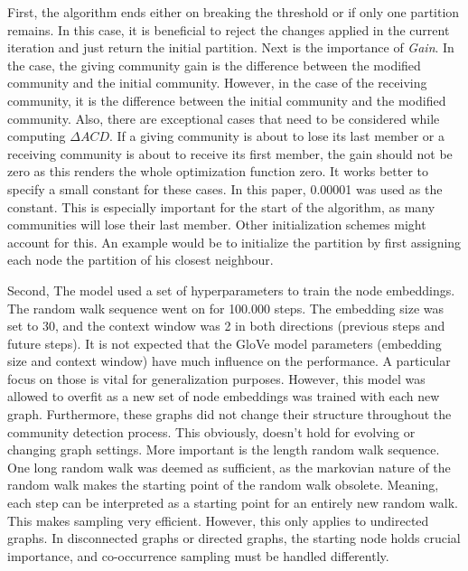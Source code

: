 \documentclass[11pt, twocolumn]{article}
\begin{document}
First, the algorithm ends either on breaking the threshold or if only one partition remains. In this case, it is beneficial to reject the changes applied in the current iteration and just return the initial partition. Next is the importance of \emph{Gain}. In the case, the giving community gain is the difference between the modified community and the initial community. However, in the case of the receiving community, it is the difference between the initial community and the modified community. Also, there are exceptional cases that need to be considered while computing $\Delta ACD$. If a giving community is about to lose its last member or a receiving community is about to receive its first member, the gain should not be zero as this renders the whole optimization function zero. It works better to specify a small constant for these cases. In this paper, 0.00001 was used as the constant. This is especially important for the start of the algorithm, as many communities will lose their last member. Other initialization schemes might account for this. An example would be to initialize the partition by first assigning each node the partition of his closest neighbour. 

Second, The model used a set of hyperparameters to train the node embeddings. The random walk sequence went on for 100.000 steps. The embedding size was set to 30, and the context window was 2 in both directions (previous steps and future steps). It is not expected that the GloVe model parameters (embedding size and context window) have much influence on the performance. A particular focus on those is vital for generalization purposes. However, this model was allowed to overfit as a new set of node embeddings was trained with each new graph. Furthermore, these graphs did not change their structure throughout the community detection process. This obviously, doesn't hold for evolving or changing graph settings. More important is the length random walk sequence. One long random walk was deemed as sufficient, as the markovian nature of the random walk makes the starting point of the random walk obsolete. Meaning, each step can be interpreted as a starting point for an entirely new random walk. This makes sampling very efficient. However, this only applies to undirected graphs. In disconnected graphs or directed graphs, the starting node holds crucial importance, and co-occurrence sampling must be handled differently. 
\end{document}
